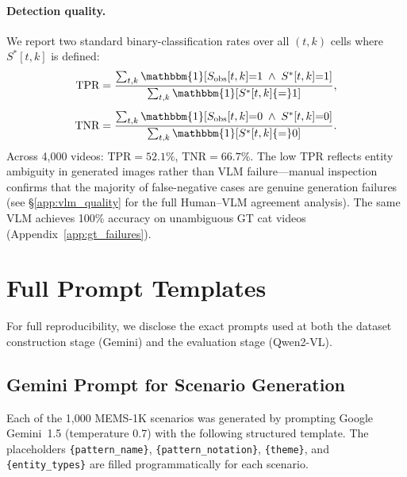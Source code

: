 \documentclass[sigconf,review,anonymous]{acmart}
\begin{document}
\paragraph{Detection quality.}
We report two standard binary-classification rates over all $(t, k)$ cells where $S^*[t,k]$ is defined:
\begin{equation}
\begin{aligned}
    \text{TPR} &= \frac{\sum_{t,k} \mathbbm{1}[S_\text{obs}[t,k]{=}1 \;\wedge\; S^*[t,k]{=}1]}{\sum_{t,k} \mathbbm{1}[S^*[t,k]{=}1]}, \\[0.5em]
    \text{TNR} &= \frac{\sum_{t,k} \mathbbm{1}[S_\text{obs}[t,k]{=}0 \;\wedge\; S^*[t,k]{=}0]}{\sum_{t,k} \mathbbm{1}[S^*[t,k]{=}0]}.
\end{aligned}
\end{equation}
Across 4,000 videos: $\text{TPR} = 52.1\%$, $\text{TNR} = 66.7\%$.
The low TPR reflects entity ambiguity in generated images rather than VLM failure---manual inspection confirms that the majority of false-negative cases are genuine generation failures (see \S\ref{app:vlm_quality} for the full Human--VLM agreement analysis). The same VLM achieves 100\% accuracy on unambiguous GT cat videos (Appendix~\ref{app:gt_failures}).


\section{Full Prompt Templates}
\label{app:full_prompts}

For full reproducibility, we disclose the exact prompts used at both the dataset construction stage (Gemini) and the evaluation stage (Qwen2-VL).

\subsection{Gemini Prompt for Scenario Generation}

Each of the 1,000 MEMS-1K scenarios was generated by prompting Google Gemini~1.5 (temperature 0.7) with the following structured template. The placeholders \texttt{\{pattern\_name\}}, \texttt{\{pattern\_notation\}}, \texttt{\{theme\}}, and \texttt{\{entity\_types\}} are filled programmatically for each scenario.
\end{document}

